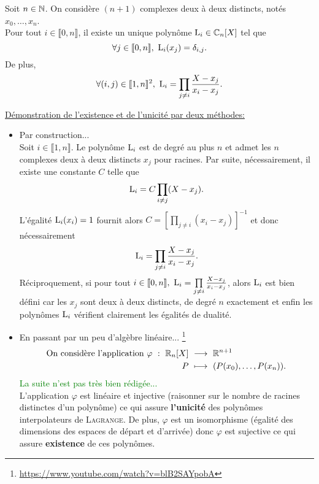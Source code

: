 \begin{theo}
    Soit $n \in \mathbb{N}$. On considère $(n + 1)$ complexes deux à deux distincts, notés $x_0, \dots, x_n$. \\
    Pour tout $i \in \llbracket 0, n \rrbracket$, il existe un unique polynôme $\mathrm{L}_i \in \mathbb{C}_n[X]$ tel que 
    $$\forall j \in \llbracket 0, n \rrbracket,\ \mathrm{L}_i(x_j) = \delta_{i,j}.$$
    De plus,
        $$\forall (i, j) \in \llbracket 1, n \rrbracket^2,\ \mathrm{L}_i = \prod_{j \neq i} \frac{X-x_j}{x_i - x_j}.$$
\end{theo}


\begin{preuve}
\underline{Démonstration de l'existence et de l'unicité par deux méthodes:} 
\begin{itemize}
    \item Par construction...\cite{maths-france} \\
    Soit $i \in \llbracket 1, n \rrbracket$. Le polynôme $\mathrm{L}_i$ est de degré au plus $n$ et admet les $n$ complexes deux à deux distincts $x_j$ pour racines. Par suite, nécessairement, il existe une constante $C$ telle que 
    $$\mathrm{L}_i = C \prod_{i \not= j} (X-x_j).$$
    L'égalité $\mathrm{L}_i(x_i) = 1$ fournit alors $C = \left[ \prod\limits_{j \not=i}(x_i - x_j) \right]^{-1}$ et donc nécessairement
    $$\mathrm{L}_i = \prod_{j \neq i} \frac{X-x_j}{x_i - x_j}.$$
    Réciproquement, si pour tout $i \in \llbracket 0, n\rrbracket,\ \mathrm{L}_i = \prod\limits_{j \neq i} \frac{X-x_j}{x_i - x_j}$, alors $\mathrm{L}_i$ est bien défini car les $x_j$ sont deux à deux distincts, de degré $n$ exactement et enfin les polynômes $\mathrm{L}_i$ vérifient clairement les égalités de dualité.
    \item En passant par un peu d'algèbre linéaire... \footnote{\url{https://www.youtube.com/watch?v=blB2SAYpobA}}
    \begin{alignat*}{2}
        \text{On considère l'application } \varphi\ :\ \R_n[X]\ &\longrightarrow\ \R^{n+1}\\
        P\ &\longmapsto\ (P(x_0), \dots, P(x_n)).
    \end{alignat*}
    \textcolor{green}{La suite n'est pas très bien rédigée...} \\
    L'application $\varphi$ est linéaire et injective (raisonner sur le nombre de racines distinctes d'un polynôme) ce qui assure \textbf{l'unicité} des polynômes interpolateurs de \textsc{Lagrange}. De plus, $\varphi$ est un isomorphisme (égalité des dimensions des espaces de départ et d'arrivée) donc $\varphi$ est sujective ce qui assure \textbf{existence} de ces polynômes. 
\end{itemize}
\end{preuve}

